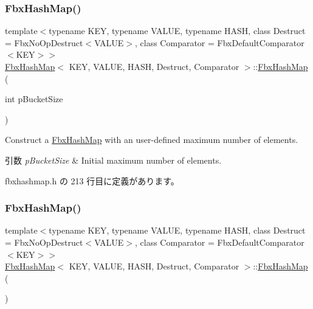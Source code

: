\subsubsection{\texorpdfstring{Fbx\+Hash\+Map()}{FbxHashMap()}\hspace{0.1cm}{\footnotesize\ttfamily [1/2]}}
{\footnotesize\ttfamily template$<$typename K\+EY, typename V\+A\+L\+UE, typename H\+A\+SH, class Destruct = Fbx\+No\+Op\+Destruct$<$\+V\+A\+L\+U\+E$>$, class Comparator = Fbx\+Default\+Comparator$<$\+K\+E\+Y$>$$>$ \\
\hyperlink{class_fbx_hash_map}{Fbx\+Hash\+Map}$<$ K\+EY, V\+A\+L\+UE, H\+A\+SH, Destruct, Comparator $>$\+::\hyperlink{class_fbx_hash_map}{Fbx\+Hash\+Map} (\begin{DoxyParamCaption}\item[{int}]{p\+Bucket\+Size }\end{DoxyParamCaption})\hspace{0.3cm}{\ttfamily [inline]}}

Construct a \hyperlink{class_fbx_hash_map}{Fbx\+Hash\+Map} with an user-\/defined maximum number of elements. 
\begin{DoxyParams}{引数}
{\em p\+Bucket\+Size} & Initial maximum number of elements. \\
\hline
\end{DoxyParams}


 fbxhashmap.\+h の 213 行目に定義があります。

\mbox{\label{class_fbx_hash_map_a398c0d23f439d50d12ff45f04d9c57f2}} 
\subsubsection{\texorpdfstring{Fbx\+Hash\+Map()}{FbxHashMap()}\hspace{0.1cm}{\footnotesize\ttfamily [2/2]}}
{\footnotesize\ttfamily template$<$typename K\+EY, typename V\+A\+L\+UE, typename H\+A\+SH, class Destruct = Fbx\+No\+Op\+Destruct$<$\+V\+A\+L\+U\+E$>$, class Comparator = Fbx\+Default\+Comparator$<$\+K\+E\+Y$>$$>$ \\
\hyperlink{class_fbx_hash_map}{Fbx\+Hash\+Map}$<$ K\+EY, V\+A\+L\+UE, H\+A\+SH, Destruct, Comparator $>$\+::\hyperlink{class_fbx_hash_map}{Fbx\+Hash\+Map} (\begin{DoxyParamCaption}{ }\end{DoxyParamCaption})\hspace{0.3cm}{\ttfamily [inline]}}

